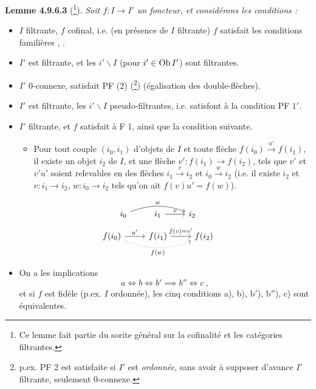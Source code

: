 \textbf{Lemme 4.9.6.3} (\footnote[99]{Ce lemme fait partie du sorite général sur la cofinalité et les catégories filtrantes.}). \textit{Soit $f : I \longrightarrow I'$ un foncteur, et considérons les conditions :}
{\itshape
\begin{itemize}[label={}]
\item[a)] $I$ filtrante, $f$ cofinal, i.e. (en présence de $I$ filtrante) $f$ satisfait les conditions familières , .
\item[b)] $I'$ est filtrante, et les $i'\backslash I$ (pour $i' \in \operatorname{Ob} I'$) sont filtrantes.
\item[b$'$)] $I'$ \textup{0}-connexe, satisfait PF (2) \textup{(}\footnote[100]{p.ex. PF 2 est satisfaite si $I'$ est \textit{ordonnée}, sans avoir à supposer d'avance $I'$ filtrante, seulement 0-connexe.}\textup{)} (égalisation des double-flèches).
\item[b$''$)] $I'$ est filtrante, les $i'\backslash I$ pseudo-filtrantes, i.e. satisfont à la condition PF $1'$.
\item[c)] $I'$ filtrante, et $f$ satisfait à F 1, ainsi que la condition suivante.
\begin{itemize}[label={}]
\item[\rbox{F 3}] Pour tout couple $(i_0,i_1)$ d'objets de $I$ et toute flèche $f(i_0) \xrightarrow{u'} f(i_1)$, il existe un objet $i_2$ de $I$, et une flèche $v' : f(i_1) \longrightarrow f(i_2)$, tels que $v'$ et $v'u'$ soient relevables en des flèches $i_1 \xrightarrow{v} i_2$ et $i_0 \xrightarrow{w} i_2$ (i.e. il existe $i_2$ et $v : i_1 \longrightarrow i_2$, $w : i_0 \longrightarrow i_2$ tels qu'on ait $f(v)u' = f(w)$).
\end{itemize}
\end{itemize}
\[
\begin{tikzcd}
i_0 \arrow[rr, bend left=20, "w"] & i_1 \arrow[r, "v"] & i_2 %
\end{tikzcd}
\]
\[
\begin{tikzcd}
f(i_0) \arrow[r, "u'"] \arrow[rr, dotted, bend right=20, "f(w)"'] & f(i_1) \arrow[r, "f(v) = v'"] & f(i_2)
\end{tikzcd}
\]
\begin{itemize}[label={}]
\item[1)] On a les implications
\[
a \iff b \iff b' \implies b'' \iff c \ ,
\]
et si $f$ est \textup{fidèle} (p.ex. $I$ ordonnée), les cinq conditions a), b), b$'$), b$''$), c) sont équivalentes.
\end{itemize}
}

